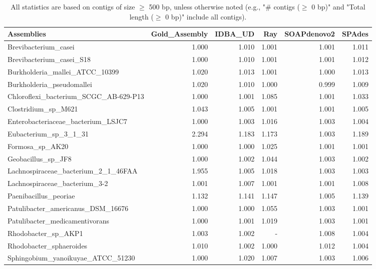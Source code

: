 \documentclass[12pt,a4paper]{article}
\begin{document}
\begin{table}[ht]
\begin{center}
\caption{All statistics are based on contigs of size $\geq$ 500 bp, unless otherwise noted (e.g., "\# contigs ($\geq$ 0 bp)" and "Total length ($\geq$ 0 bp)" include all contigs).}
\begin{tabular}{|l*{5}{|r}|}
\hline
Assemblies & Gold\_Assembly & IDBA\_UD & Ray & SOAPdenovo2 & SPAdes \\ \hline
Brevibacterium\_casei & 1.000 & 1.010 & 1.001 & 1.001 & 1.011 \\ \hline
Brevibacterium\_casei\_S18 & 1.000 & 1.010 & 1.001 & 1.001 & 1.012 \\ \hline
Burkholderia\_mallei\_ATCC\_10399 & 1.020 & 1.013 & 1.001 & 1.000 & 1.013 \\ \hline
Burkholderia\_pseudomallei & 1.020 & 1.010 & 1.000 & 0.999 & 1.009 \\ \hline
Chloroflexi\_bacterium\_SCGC\_AB-629-P13 & 1.000 & 1.001 & 1.085 & 1.001 & 1.033 \\ \hline
Clostridium\_sp\_M621 & 1.043 & 1.005 & 1.001 & 1.001 & 1.005 \\ \hline
Enterobacteriaceae\_bacterium\_LSJC7 & 1.000 & 1.003 & 1.016 & 1.003 & 1.004 \\ \hline
Eubacterium\_sp\_3\_1\_31 & 2.294 & 1.183 & 1.173 & 1.003 & 1.189 \\ \hline
Formosa\_sp\_AK20 & 1.000 & 1.000 & 1.025 & 1.001 & 1.001 \\ \hline
Geobacillus\_sp\_JF8 & 1.000 & 1.002 & 1.044 & 1.003 & 1.002 \\ \hline
Lachnospiraceae\_bacterium\_2\_1\_46FAA & 1.955 & 1.005 & 1.018 & 1.003 & 1.003 \\ \hline
Lachnospiraceae\_bacterium\_3-2 & 1.001 & 1.007 & 1.001 & 1.001 & 1.008 \\ \hline
Paenibacillus\_peoriae & 1.132 & 1.141 & 1.147 & 1.005 & 1.139 \\ \hline
Patulibacter\_americanus\_DSM\_16676 & 1.000 & 1.000 & 1.055 & 1.003 & 1.001 \\ \hline
Patulibacter\_medicamentivorans & 1.000 & 1.001 & 1.019 & 1.003 & 1.001 \\ \hline
Rhodobacter\_sp\_AKP1 & 1.003 & 1.002 & - & 1.008 & 1.004 \\ \hline
Rhodobacter\_sphaeroides & 1.010 & 1.002 & 1.000 & 1.012 & 1.004 \\ \hline
Sphingobium\_yanoikuyae\_ATCC\_51230 & 1.000 & 1.020 & 1.007 & 1.003 & 1.006 \\ \hline

\end{tabular}
\end{center}
\end{table}
\end{document}
